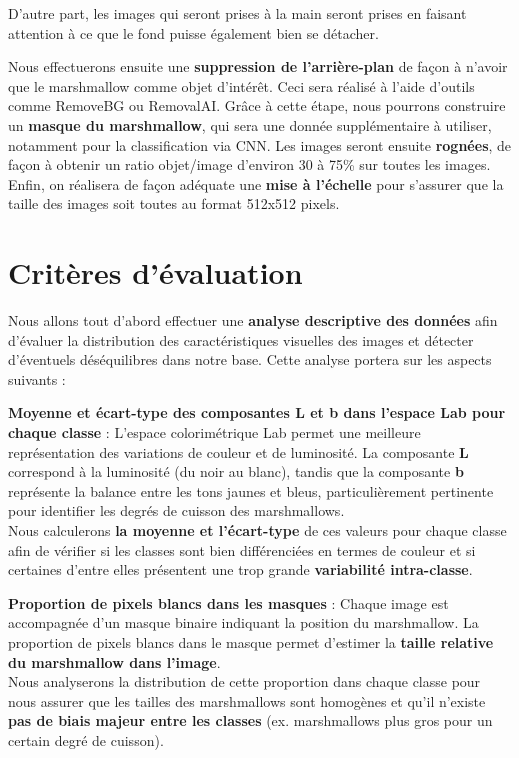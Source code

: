 \documentclass[11pt, openright]{book}
\begin{document}
    D’autre part, les images qui seront prises à la main seront prises en faisant attention à ce que le fond puisse également bien se détacher.
    
    Nous effectuerons ensuite une \textbf{suppression de l'arrière-plan} de façon à n’avoir que le marshmallow comme objet d'intérêt. Ceci sera réalisé à l’aide d'outils comme RemoveBG ou RemovalAI. Grâce à cette étape, nous pourrons construire un \textbf{masque du marshmallow}, qui sera une donnée supplémentaire à utiliser, notamment pour la classification via CNN.
    Les images seront ensuite \textbf{rognées}, de façon à obtenir un ratio objet/image d’environ 30 à 75\% sur toutes les images. Enfin, on réalisera de façon adéquate une \textbf{mise à l’échelle} pour s’assurer que la taille des images soit toutes au format 512x512 pixels.
    
\section{Critères d’évaluation}
    Nous allons tout d’abord effectuer une \textbf{analyse descriptive des données} afin d’évaluer la distribution des caractéristiques visuelles des images et détecter d’éventuels déséquilibres dans notre base. Cette analyse portera sur les aspects suivants :
    \begin{items}{-15pt}{-15pt}
        \item \textbf{Moyenne et écart-type des composantes L et b dans l’espace Lab pour chaque classe} : L’espace colorimétrique Lab permet une meilleure représentation des variations de couleur et de luminosité. La composante \textbf{L} correspond à la luminosité (du noir au blanc), tandis que la composante \textbf{b} représente la balance entre les tons jaunes et bleus, particulièrement pertinente pour identifier les degrés de cuisson des marshmallows.\\
        Nous calculerons \textbf{la moyenne et l’écart-type} de ces valeurs pour chaque classe afin de vérifier si les classes sont bien différenciées en termes de couleur et si certaines d’entre elles présentent une trop grande \textbf{variabilité intra-classe}.
        \item \textbf{Proportion de pixels blancs dans les masques} :
        Chaque image est accompagnée d’un masque binaire indiquant la position du marshmallow. La proportion de pixels blancs dans le masque permet d’estimer la \textbf{taille relative du marshmallow dans l’image}.\\
        Nous analyserons la distribution de cette proportion dans chaque classe pour nous assurer que les tailles des marshmallows sont homogènes et qu’il n’existe \textbf{pas de biais majeur entre les classes} (ex. marshmallows plus gros pour un certain degré de cuisson).
    \end{items}
    
\end{document}
